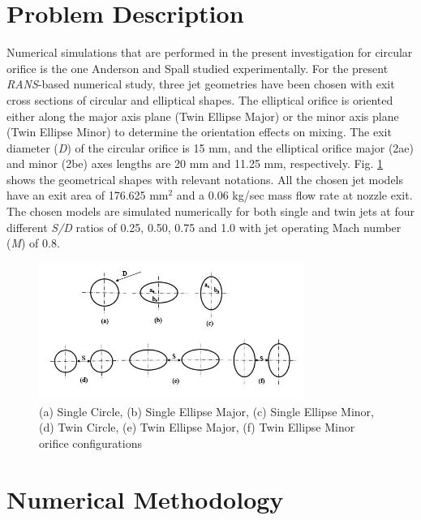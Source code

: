 \documentclass[Afour,sagev,times]{sagej}
\begin{document}
\section{Problem Description}

Numerical simulations that are performed in the present investigation for circular orifice is the one Anderson and Spall \cite{anderson2001experimental} studied experimentally. For the present \textit{RANS}-based numerical study, three jet geometries have been chosen with exit cross sections of circular and elliptical shapes. The elliptical orifice is oriented either along the major axis plane (Twin Ellipse Major) or the minor axis plane (Twin Ellipse Minor) to determine the orientation effects on mixing. The exit diameter (\textit{D}) of the circular orifice is 15 mm, and the elliptical orifice major (2ae) and minor (2be) axes lengths are 20 mm and 11.25 mm, respectively. Fig. \ref{fig:models} shows the geometrical shapes with relevant notations. All the chosen jet models have an exit area of 176.625 mm${}^{2}$ and a 0.06 kg/sec mass flow rate at nozzle exit. The chosen models are simulated numerically for both single and twin jets at four different \textit{S/D} ratios of 0.25, 0.50, 0.75 and 1.0 with jet operating Mach number (\textit{M}) of 0.8. 
\begin{figure}[h]
\centering
\includegraphics[width=3.4in]{geometrical models.png}
\caption{(a) Single Circle, (b) Single Ellipse Major, (c) Single Ellipse Minor, (d) Twin Circle, (e) Twin Ellipse Major, (f) Twin Ellipse Minor orifice configurations}
\label{fig:models}
\end{figure}
\section{Numerical Methodology}
\end{document}
